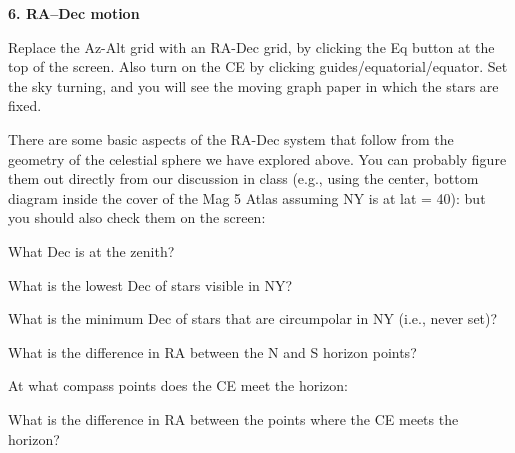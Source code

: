 \documentclass[12pt]{article}
\begin{document}
\bigskip\noindent
{\bf 6. RA--Dec motion}

\medskip\noindent
Replace the Az-Alt grid with an RA-Dec grid, by clicking the Eq button
at the top of the screen. Also turn on the CE by clicking
guides/equatorial/equator. Set the sky turning, and you will see the
moving graph paper in which the stars are fixed.


\newpage
\noindent
There are some basic aspects of the RA-Dec system that follow from the
geometry of the celestial sphere we have explored above. You can
probably figure them out directly from our discussion in class (e.g.,
using the center, bottom diagram inside the cover of the Mag 5 Atlas
assuming NY is at lat = 40\deg): but
you should also check them on the screen: 

\bigskip
\noindent
What Dec is at the zenith?\  \makebox[4cm]{\hrulefill}

\noindent
What is the lowest Dec of stars visible in NY?  \makebox[4cm]{\hrulefill}

\noindent
What is the minimum Dec of stars that are circumpolar in NY (i.e.,
never set)? \makebox[3cm]{\hrulefill}

\noindent
What is the difference in RA between the N and S horizon
points? \makebox[4cm]{\hrulefill}

\noindent
At what compass points does the CE meet the horizon:\makebox[3cm]{\hrulefill}

\noindent
What is the difference in RA between the points where the CE meets the
horizon? \makebox[3cm]{\hrulefill}
\end{document}
